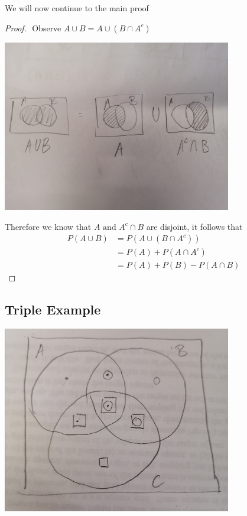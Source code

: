\documentclass[11pt]{book}
\begin{document}
We will now continue to the main proof 
\begin{proof}
$ $\newline
Observe $A\cup B= A \cup \left( B\cap A^{c}  \right) $ 
\begin{center}
    \includegraphics[width=100mm]{assets/ch1_mp.jpg} 
\end{center}
Therefore we know that $A \text{ and } A^{c} \cap B$ are disjoint, it follows that 
\begin{align*}
    P\left(A\cup B\right) &= P\left(A\cup \left( B\cap A^{c}  \right) \right)   \\ 
    &= P\left(A\right)  + P\left(A\cap A^{c} \right) \tag{By axiom 3}  \\ 
    &= P\left(A\right)  + P\left(B\right)  - P\left(A\cap B\right) \tag{By our lemma}
\end{align*}
\end{proof}

\subsection{Triple Example}%
\label{sub:triple_example}

\begin{center}
    \includegraphics[width=100mm]{assets/lec1_triple.jpg} 
\end{center}
\end{document}
